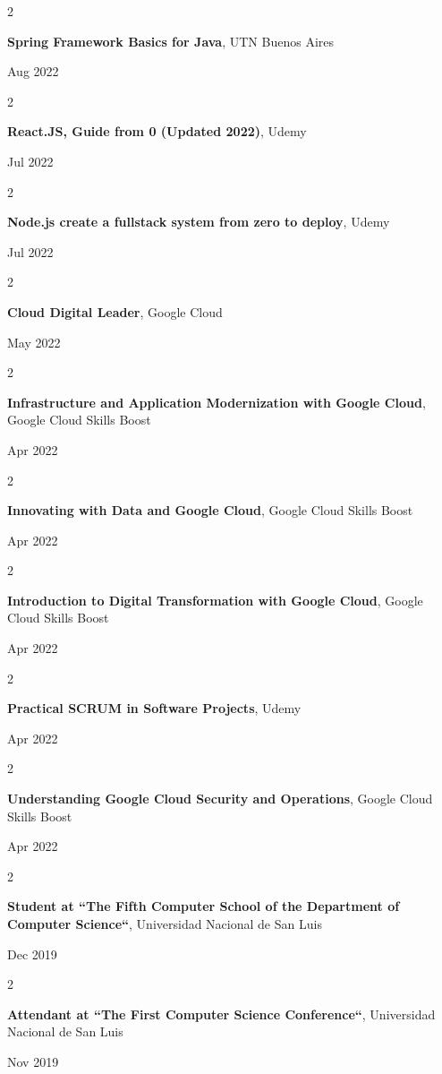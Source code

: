 \documentclass[10pt, letterpaper]{article}
\newenvironment{twocolentry}[2][]{
    \onecolentry
    \def\secondColumn{#2}
    \setcolumnwidth{\fill, 4.5 cm}
    \begin{paracol}{2}
}{
    \switchcolumn \raggedleft \secondColumn
    \end{paracol}
    \endonecolentry
} %
\begin{document}
    \begin{twocolentry}{
            Aug 2022
        }
        \textbf{Spring Framework Basics for Java}, UTN Buenos Aires
    \end{twocolentry}
    \begin{twocolentry}{
            Jul 2022
        }
        \textbf{React.JS, Guide from 0 (Updated 2022)}, Udemy
    \end{twocolentry}
    \begin{twocolentry}{
            Jul 2022
        }
        \textbf{Node.js create a fullstack system from zero to deploy}, Udemy
    \end{twocolentry}
    \begin{twocolentry}{
            May 2022
        }
        \textbf{Cloud Digital Leader}, Google Cloud
    \end{twocolentry}
    \begin{twocolentry}{
            Apr 2022
        }
        \textbf{Infrastructure and Application Modernization with Google Cloud}, Google Cloud Skills Boost
    \end{twocolentry}
    \begin{twocolentry}{
            Apr 2022
        }
        \textbf{Innovating with Data and Google Cloud}, Google Cloud Skills Boost
    \end{twocolentry}
    \begin{twocolentry}{
            Apr 2022
        }
        \textbf{Introduction to Digital Transformation with Google Cloud}, Google Cloud Skills Boost
    \end{twocolentry}
    \begin{twocolentry}{
            Apr 2022
        }
        \textbf{Practical SCRUM in Software Projects}, Udemy
    \end{twocolentry}
    \begin{twocolentry}{
            Apr 2022
        }
        \textbf{Understanding Google Cloud Security and Operations}, Google Cloud Skills Boost
    \end{twocolentry}
    \begin{twocolentry}{
            Dec 2019
        }
        \textbf{Student at “The Fifth Computer School of the Department of Computer Science“}, Universidad Nacional de San Luis
    \end{twocolentry}
    \begin{twocolentry}{
            Nov 2019
        }
        \textbf{Attendant at “The First Computer Science Conference“}, Universidad Nacional de San Luis
    \end{twocolentry}
\end{document}

